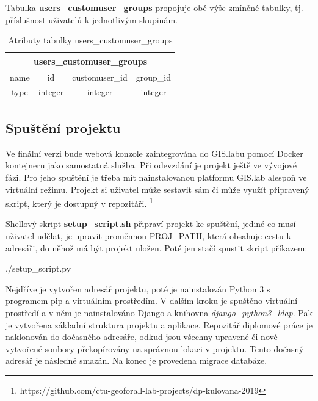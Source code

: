 \begin{table}[H]
\centering
{}
\caption{Atributy tabulky users\_customuser 2/2}
\label{tab:users-customuser-2}
\end{table}

Tabulka \textbf{users\_customuser\_groups} propojuje obě výše zmíněné
tabulky, tj. příslušnost uživatelů k jednotlivým skupinám.

\begin{table}[H]
\centering
\begin{tabular}{@{}|c|c|c|c|@{}}
\toprule
\multicolumn{4}{|c|}{users\_customuser\_groups} \\ \midrule
name & id & customuser\_id & group\_id \\ \midrule
type & integer & integer & integer \\ \bottomrule
\end{tabular}
\caption{Atributy tabulky users\_customuser\_groups}
\label{tab:users-customuser-groups}
\end{table}

\subsection{Spuštění projektu}
Ve finální verzi bude webová konzole zaintegrována do GIS.labu pomocí
Docker kontejneru jako samostatná služba. Při odevzdání je projekt
ještě ve vývojové fázi. Pro jeho spuštění je třeba mít nainstalovanou
platformu GIS.lab alespoň ve virtuální režimu. Projekt si uživatel
může sestavit sám či může využít připravený skript, který je dostupný
v
repozitáři. \footnote{https://github.com/ctu-geoforall-lab-projects/dp-kulovana-2019}

Shellový skript \textbf{setup\_script.sh} připraví projekt ke
spuštění, jediné co musí uživatel udělat, je upravit proměnnou
\textsf{PROJ\_PATH}, která obsahuje cestu k adresáři, do něhož má být
projekt uložen. Poté jen stačí spustit skript příkazem:
\begin{center}
\textsf{./setup\_script.py}
\end{center}
Nejdříve je vytvořen adresář projektu, poté je nainstalován Python 3 s
programem pip a virtuálním prostředím. V dalším kroku je spuštěno
virtuální prostředí a v něm je nainstalováno Django a knihovna
\textit{django\_python3\_ldap}. Pak je vytvořena základní struktura
projektu a aplikace. Repozitář diplomové práce je naklonován do
dočasného adresáře, odkud jsou všechny upravené či nově vytvořené
soubory překopírovány na správnou lokaci v projektu. Tento dočasný
adresář je následně smazán. Na konec je provedena migrace databáze.

